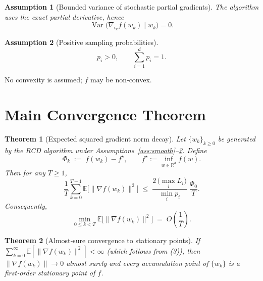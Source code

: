 \documentclass{article}
\newtheorem{theorem}{Theorem}
\newtheorem{assumption}{Assumption}
\newcommand{\E}{\mathbb{E}}
\newcommand{\R}{\mathbb{R}}
\begin{document}
\begin{assumption}[Bounded variance of stochastic partial gradients]\label{ass:bounded}
The algorithm uses the exact partial derivative, hence
\[
\operatorname{Var}\bigl(\nabla_{i_k} f(w_k)\mid w_k\bigr)=0 .
\]
\end{assumption}

\begin{assumption}[Positive sampling probabilities]\label{ass:prob}
\[
p_i>0,\qquad \sum_{i=1}^d p_i =1 .
\]
\end{assumption}

No convexity is assumed; $f$ may be non‑convex.

\section*{Main Convergence Theorem}
\begin{theorem}[Expected squared gradient norm decay]\label{thm:main}
Let $\{w_k\}_{k\ge0}$ be generated by the RCD algorithm under
Assumptions~\ref{ass:smooth}--\ref{ass:prob}. Define
\[
\Phi_k \;:=\; f(w_k)-f^\star,\qquad 
f^\star:=\inf_{w\in\R^d} f(w) .
\]
Then for any $T\ge1$,
\begin{equation}
\frac{1}{T}\sum_{k=0}^{T-1}\E\!\bigl[ \|\nabla f(w_k)\|^2 \bigr]
\;\le\;
\frac{2\,\bigl(\max_i L_i\bigr)}{\displaystyle \min_i p_i}\;
\frac{ \Phi_0 }{T}.
\tag{3}
\end{equation}
Consequently,
\[
\min_{0\le k<T}\E\!\bigl[ \|\nabla f(w_k)\|^2 \bigr]
\;=\; O\!\left(\frac{1}{T}\right).
\]
\end{theorem}

\begin{theorem}[Almost‑sure convergence to stationary points]\label{thm:as}
If $\sum_{k=0}^\infty \E[\|\nabla f(w_k)\|^2] <\infty$ (which follows from (3)),
then $\|\nabla f(w_k)\|\to0$ almost surely and every accumulation point of
$\{w_k\}$ is a first‑order stationary point of $f$.
\end{theorem}

\end{document}
